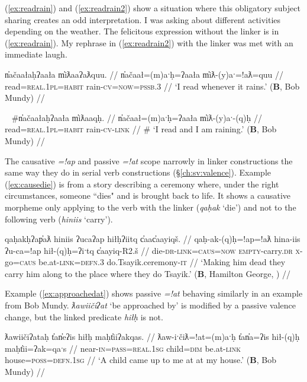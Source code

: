 (\ref{ex:readrain}) and (\ref{ex:readrain2}) show a situation where this obligatory subject sharing creates an odd interpretation. I was asking about different activities depending on the weather. The felicitous expression without the linker is in (\ref{ex:readrain}). My rephrase in (\ref{ex:readrain2}) with the linker was met with an immediate laugh.

\ex \label{ex:readrain}
\begingl
\glpreamble n̓ačaałaḥʔaała m̓iƛaaʔaƛquu. //
\gla n̓ačaał=(m)aˑḥ=ʔaała m̓iƛ-(y)aˑ=!aƛ=quu //
\glb read=\textsc{real.1pl}=\textsc{habit} rain-\textsc{cv}=\textsc{now}=\textsc{pssb.3} //
\glft `I read whenever it rains.' (\textbf{B}, Bob Mundy) //
\endgl
\xe

\ex~ \label{ex:readrain2}
\begingl
\glpreamble \#n̓ačaałaḥʔaała m̓iƛaaqḥ. //
\gla n̓ačaał=(m)aˑḥ=ʔaała m̓iƛ-(y)aˑ-(q)ḥ //
\glb read=\textsc{real.1pl}=\textsc{habit} rain-\textsc{cv}-\textsc{link} //
\glft \# `I read and I am raining.' (\textbf{B}, Bob Mundy) //
\endgl
\xe

The causative \textit{=!ap} and passive \textit{=!at} scope narrowly in linker constructions the same way they do in serial verb constructions (\S\ref{ch:sv:valence}). Example (\ref{ex:causedie}) is from a story describing a ceremony where, under the right circumstances, someone ``dies" and is brought back to life. It shows a causative morpheme only applying to the verb with the linker (\textit{qaḥak} `die') and not to the following verb (\textit{hiniis} `carry').

\ex \label{ex:causedie}
\begingl
\glpreamble qaḥakḥʔap̓aƛ hiniis ʔucaʔap hiłḥʔiitq c̓aac̓aayiqš. //
\gla qaḥ-ak-(q)ḥ=!ap=!aƛ hina-iis ʔu-ca=!ap hił-(q)ḥ=ʔiˑtq c̓aayiq-R2.š //
\glb die-\textsc{dr}-\textsc{link}=\textsc{caus}=\textsc{now} \textsc{empty}-carry.\textsc{dr} \textsc{x}-go=\textsc{caus} be.at-\textsc{link}=\textsc{defn.3} do.Tsayik.ceremony-\textsc{it} //
\glft `Making him dead they carry him along to the place where they do Tsayik.' (\textbf{B}, Hamilton George, \citealt[p.~106]{sapir1939}) //
\endgl
\xe

Example (\ref{ex:approachedat}) shows passive \textit{=!at} behaving similarly in an example from Bob Mundy. \textit{ƛawiičiʔat} `be approached by' is modified by a passive valence change, but the linked predicate \textit{hiłḥ} is not.

\ex \label{ex:approachedat}
\begingl
\glpreamble ƛawiičiʔataḥ t̓an̓eʔis hiłḥ maḥt̓iiʔakqas. //
\gla ƛaw-iˑčiƛ=!at=(m)aˑḥ t̓an̓a=ʔis hił-(q)ḥ maḥt̓ii=ʔak=qaˑs //
\glb near-\textsc{in}=\textsc{pass}=\textsc{real.1sg} child=\textsc{dim} be.at-\textsc{link} house=\textsc{poss}=\textsc{defn.1sg} //
\glft `A child came up to me at at my house.' (\textbf{B}, Bob Mundy) //
\endgl
\xe

